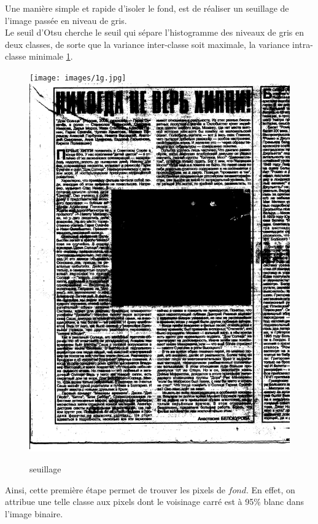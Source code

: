 \documentclass{book}
\begin{document}
Une manière simple et rapide d'isoler le fond, est de réaliser un seuillage de l'image passée en niveau de gris.\\
Le seuil d'Otsu cherche le seuil qui sépare l'histogramme des niveaux de gris en deux classes, de sorte que la variance inter-classe soit maximale, la variance intra-
classe minimale \ref{seuillage}.\\

\begin{figure}[H]
\begin{center}
\texttt{[image: images/1g.jpg]}
\includegraphics[scale=0.2]{images/1g_binary.jpg}
\end{center}
\caption{seuillage}
\label{seuillage}
\end{figure}

Ainsi, cette première étape permet de trouver les pixels de $fond$. En effet, on attribue une telle classe aux pixels dont le voisinage carré est à 95\% blanc 
dans l'image binaire.
\end{document}

